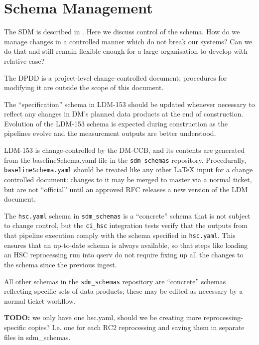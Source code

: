 \section{Schema Management}

The SDM is described in . Here we discuss control of the schema.
How do we manage changes in a controlled manner which do not break our systems?
Can we do that and still remain flexible enough for a large organisation to develop with relative ease?

The DPDD is a project-level change-controlled document; procedures for modifying it are outside the
scope of this document.

The ``specification'' schema in LDM-153 should be updated whenever necessary to reflect any changes
in DM's planned data products at the end of construction. Evolution of the LDM-153 schema is
expected during construction as the pipelines evolve and the measurement outputs are better
understood.

LDM-153 is change-controlled by the DM-CCB, and its contents are generated from the baselineSchema.yaml file
in the \texttt{sdm\_schemas} repository. Procedurally, \texttt{baselineSchema.yaml} should be
treated like any other LaTeX input for a change controlled document: changes to it may be merged to
master via a normal ticket, but are not ``official'' until an approved RFC releases a new version of
the LDM document.

The \texttt{hsc.yaml} schema in \texttt{sdm\_schemas} is a ``concrete'' schema that is not subject
to change control, but the \texttt{ci\_hsc} integration tests verify that the outputs from that
pipeline execution comply with the schema specified in \texttt{hsc.yaml}. This ensures that an
up-to-date schema is always available, so that steps like loading an HSC reprocessing run into qserv
do not require fixing up all the changes to the schema since the previous ingest.

All other schemas in the \texttt{sdm\_schemas} repository are ``concrete'' schemas reflecting
specific sets of data products; these may be edited as necessary by a normal ticket workflow.

\textbf{TODO:} we only have one hsc.yaml, should we be creating more reprocessing-specific copies?
I.e. one for each RC2 reprocessing and saving them in separate files in sdm\_schemas.

